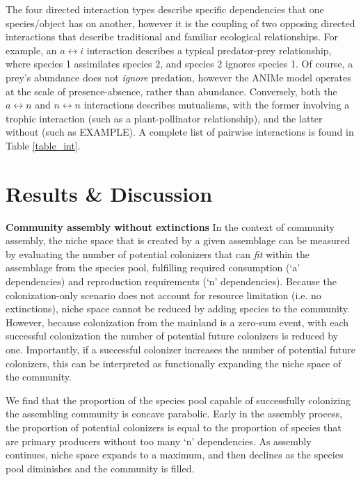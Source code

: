 \documentclass[twocolumn,preprintnumbers,amsmath,amssymb,superscriptaddress]{revtex4}
\begin{document}
The four directed interaction types describe specific dependencies that one species/object has on another, however it is the coupling of two opposing directed interactions that describe traditional and familiar ecological relationships.
For example, an $a \leftrightarrow i$ interaction describes a typical predator-prey relationship, where species 1 assimilates species 2, and species 2 ignores species 1.
Of course, a prey's abundance does not \emph{ignore} predation, however the ANIMe model operates at the scale of presence-absence, rather than abundance.
Conversely, both the $a \leftrightarrow n$ and $n \leftrightarrow n$ interactions describes mutualisms, with the former involving a trophic interaction (such as a plant-pollinator relationship), and the latter without (such as EXAMPLE).
A complete list of pairwise interactions is found in Table \ref{table_int}.







\section*{Results \& Discussion}


{\bf Community assembly without extinctions}
In the context of community assembly, the niche space that is created by a given assemblage can be measured by evaluating the number of potential colonizers that can \emph{fit} within the assemblage from the species pool, fulfilling required consumption (`a' dependencies) and reproduction requirements (`n' dependencies).
Because the colonization-only scenario does not account for resource limitation (i.e. no extinctions), niche space cannot be reduced by adding species to the community.
However, because colonization from the mainland is a zero-sum event, with each successful colonization the number of potential future colonizers is reduced by one.
Importantly, if a successful colonizer increases the number of potential future colonizers, this can be interpreted as functionally expanding the niche space of the community.


We find that the proportion of the species pool capable of successfully colonizing the assembling community is concave parabolic.
Early in the assembly process, the proportion of potential colonizers is equal to the proportion of species that are primary producers without too many `n' dependencies.
As assembly continues, niche space expands to a maximum, and then declines as the species pool diminishes and the community is filled.
\end{document}
